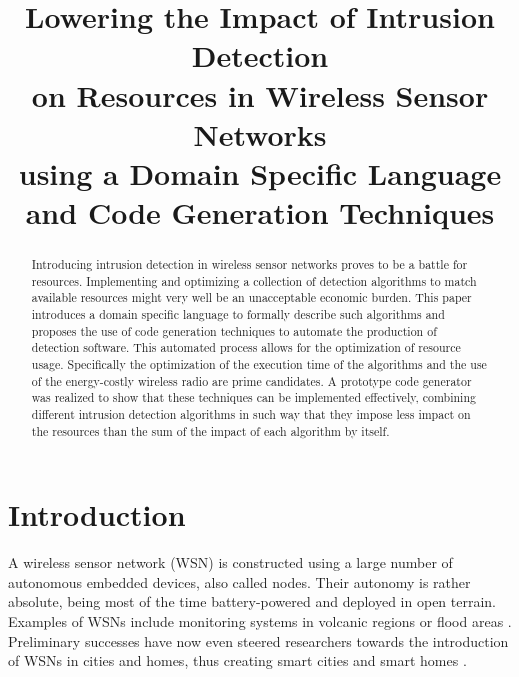 \documentclass[conference]{IEEEtran}
\begin{document}
\expandafter\def\csname PY@tok@err\endcsname{}

\title{Lowering the Impact of Intrusion Detection\\
on Resources in Wireless Sensor Networks\\
using a Domain Specific Language\\
and Code Generation Techniques}

\author{%
}

\maketitle

\begin{abstract}
  
Introducing intrusion detection in wireless sensor networks proves to be a
battle for resources. Implementing and optimizing a collection of detection
algorithms to match available resources might very well be an unacceptable
economic burden. This paper introduces a domain specific language to formally
describe such algorithms and proposes the use of code generation techniques to
automate the production of detection software. This automated process allows
for the optimization of resource usage. Specifically the optimization of the
execution time of the algorithms and the use of the energy-costly wireless
radio are prime candidates. A prototype code generator was realized to show
that these techniques can be implemented effectively, combining different
intrusion detection algorithms in such way that they impose less impact on the
resources than the sum of the impact of each algorithm by itself.

\end{abstract}

\section{Introduction}

A wireless sensor network (WSN) is constructed using a large number of
autonomous embedded devices, also called nodes. Their autonomy is rather
absolute, being most of the time battery-powered and deployed in open terrain.
Examples of WSNs include monitoring systems in volcanic regions
\cite{werner2006deploying} or flood areas \cite{hughes2006gridstix}.
Preliminary successes have now even steered researchers towards the
introduction of WSNs in cities and homes, thus creating smart cities
\cite{schaffers2011smart} and smart homes \cite{chan2008review}.
\end{document}
